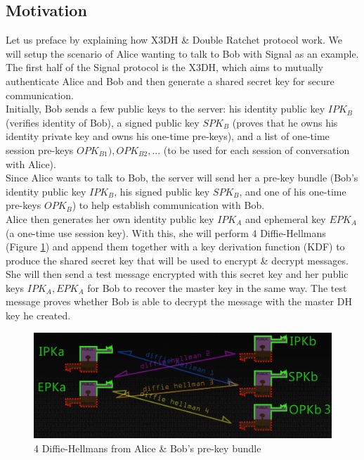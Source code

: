 \documentclass[11pt]{article}
\begin{document}
\subsection{Motivation}
Let us preface by explaining how X3DH \& Double Ratchet protocol work. We will setup the scenario of Alice wanting to talk to Bob with Signal as an example. The first half of the Signal protocol is the X3DH, which aims to mutually authenticate Alice and Bob and then generate a shared secret key for secure communication.
\\
Initially, Bob sends a few public keys to the server: his identity public key $IPK_B$ (verifies identity of Bob), a signed public key $SPK_B$ (proves that he owns his identity private key and owns his one-time pre-keys), and a list of one-time session pre-keys $OPK_{B1}), OPK_{B2}, ...$ (to be used for each session of conversation with Alice).
\\
Since Alice wants to talk to Bob, the server will send her a pre-key bundle (Bob's identity public key $IPK_B$, his signed public key $SPK_B$, and one of his one-time pre-keys $OPK_B$) to help establish communication with Bob.
\\
Alice then generates her own identity public key $IPK_A$ and ephemeral key $EPK_A$ (a one-time use session key). With this, she will perform 4 Diffie-Hellmans (Figure \ref{fig:X3DH_1}) and append them together with a key derivation function (KDF) to produce the shared secret key that will be used to encrypt \& decrypt messages. She will then send a test message encrypted with this secret key and her public keys $IPK_A, EPK_A$ for Bob to recover the master key in the same way. The test message proves whether Bob is able to decrypt the message with the master DH key he created.
\\
\begin{figure}[htbp]
    \centering
    \includegraphics[width=1\linewidth]{images/X3DH 1.png}
    \caption{4 Diffie-Hellmans from Alice \& Bob's pre-key bundle}
    \label{fig:X3DH_1}
\end{figure}
\end{document}
